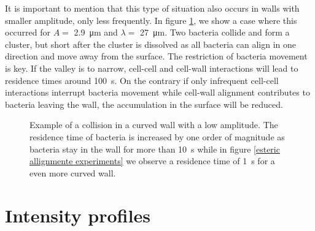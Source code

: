 It is important to mention that this type of situation also occurs in walls with smaller amplitude, only less frequently. In figure \ref{cluster with low amplitude}, we show a case where this occurred for $A=$ \SI{2.9}{\micro\meter} and $\lambda=$ \SI{27}{\micro\meter}. Two bacteria collide and form a cluster, but short after the cluster is dissolved as all bacteria can align in one direction and move away from the surface. The restriction of bacteria movement is key. If the valley is to narrow, cell-cell and cell-wall interactions will lead to residence times around \SI{100}{\second}. On the contrary if only infrequent cell-cell interactions interrupt bacteria movement while cell-wall alignment contributes to bacteria leaving the wall, the accumulation in the surface will be reduced.

\begin{figure}
	\centering
	
	\caption[Collision in a curved wall with low amplitude]{Example of a collision in a curved wall with a low amplitude. The residence time of bacteria is increased by one order of magnitude as bacteria stay in the wall for more than \SI{10}{\second} while in figure \ref{esteric allignmente experiments} we observe a residence time of \SI{1}{\second} for a even more curved wall.  }
	\label{cluster with low amplitude}
\end{figure}
 
\label{section:intensity}
\section{Intensity profiles}


